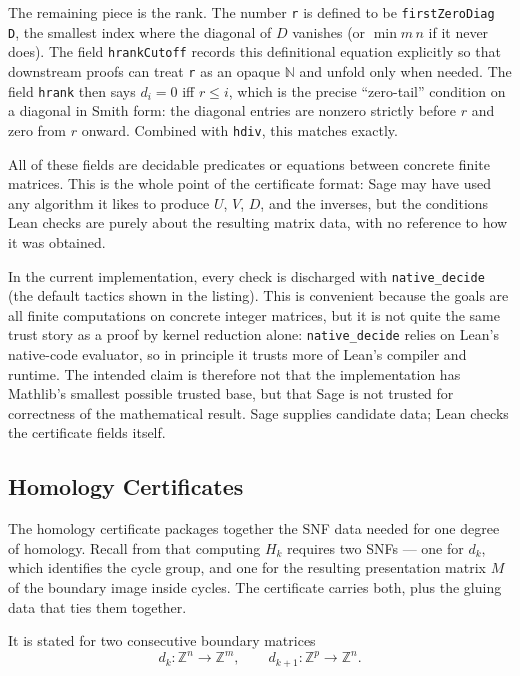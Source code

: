 \documentclass[11pt]{article}
\theoremstyle{plain}
\theoremstyle{definition}
\theoremstyle{remark}
\newcommand{\lean}[1]{\lstinline[language=lean]|#1|}
\begin{document}
The remaining piece is the rank. The number \lean{r} is defined to be
\lean{firstZeroDiag D}, the smallest index where the diagonal of \(D\)
vanishes (or \(\min m\, n\) if it never does). The field \lean{hrankCutoff}
records this definitional equation explicitly so that downstream proofs can
treat \lean{r} as an opaque $\mathbb{N}$ and unfold only when needed. The field
\lean{hrank} then says \(d_i = 0\) iff \(r \leq i\), which is the precise
``zero-tail'' condition on a diagonal in Smith form: the diagonal entries are
nonzero strictly before \(r\) and zero from \(r\) onward. Combined with
\lean{hdiv}, this matches  exactly.

All of these fields are decidable predicates or equations between concrete
finite matrices. This is the whole point of the certificate format: Sage may
have used any algorithm it likes to produce \(U\), \(V\), \(D\), and the
inverses, but the conditions Lean checks are purely about the resulting matrix
data, with no reference to how it was obtained.

In the current implementation, every check is discharged with
\lean{native_decide} (the default tactics shown in the listing). This is
convenient because the goals are all finite computations on concrete integer
matrices, but it is not quite the same trust story as a proof by kernel
reduction alone: \lean{native_decide} relies on Lean's native-code evaluator,
so in principle it trusts more of Lean's compiler and runtime. The intended
claim is therefore not that the implementation has Mathlib's smallest possible
trusted base, but that Sage is not trusted for correctness of the
mathematical result. Sage supplies candidate data; Lean checks the certificate
fields itself.

\subsection{Homology Certificates}

The homology certificate packages together the SNF data needed for one degree
of homology. Recall from  that computing \(H_k\) requires
two SNFs --- one for \(d_k\), which identifies the cycle group, and one for
the resulting presentation matrix \(M\) of the boundary image inside cycles.
The certificate carries both, plus the gluing data that ties them together.

It is stated for two consecutive boundary matrices
\[
    d_k : \mathbb{Z}^{n} \to \mathbb{Z}^{m},
    \qquad
    d_{k+1} : \mathbb{Z}^{p} \to \mathbb{Z}^{n}.
\]
\end{document}
